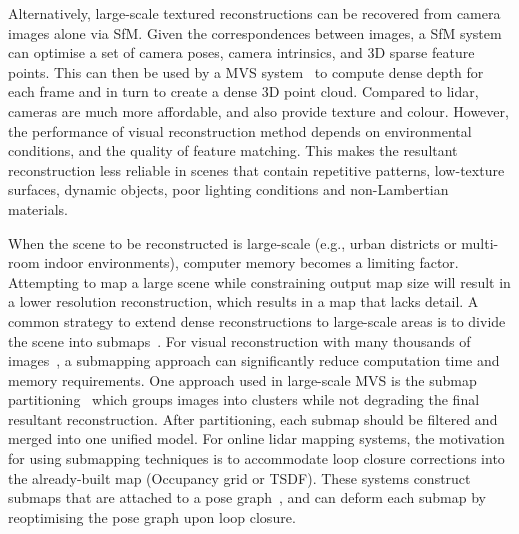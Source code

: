 Alternatively, large-scale textured reconstructions can be recovered from camera images alone via SfM. Given the correspondences between images, a SfM system~\cite{schoenberger2016colmap} can optimise a set of camera poses, camera intrinsics, and 3D sparse feature points. This can then be used by a MVS system~\cite{furukawa2010dense} to compute dense depth for each frame and in turn to create a dense 3D point cloud. Compared to lidar, cameras are much more affordable, and also provide texture and colour. However, the performance of visual reconstruction method depends on environmental conditions, and the quality of feature matching. This makes the resultant reconstruction less reliable in scenes that contain repetitive patterns, low-texture surfaces, dynamic objects, poor lighting conditions and non-Lambertian materials.



When the scene to be reconstructed is large-scale (e.g., urban districts or multi-room indoor environments),  computer memory becomes a limiting factor. Attempting to map a large scene while constraining output map size will result in a lower resolution reconstruction, which results in a map that lacks detail. A common strategy to extend dense reconstructions to large-scale areas is to divide the scene into submaps~\cite{bosse2003atlas}. For visual reconstruction with many thousands of images~\cite{agarwal2011building}, a submapping approach can significantly reduce computation time and memory requirements. One approach used in large-scale MVS is the submap partitioning~\cite{furukawa2010towards} which groups images into clusters while not degrading the final resultant reconstruction. After partitioning, each submap should be filtered and merged into one unified model. For online lidar mapping systems, the motivation for using submapping techniques is to accommodate loop closure corrections into the already-built map (Occupancy grid or TSDF). These systems construct submaps that are attached to a pose graph~\cite{ho2018virtual,reijgwart2020voxgraph,wang2022strategies}, and can deform each submap by reoptimising the pose graph upon loop closure.

